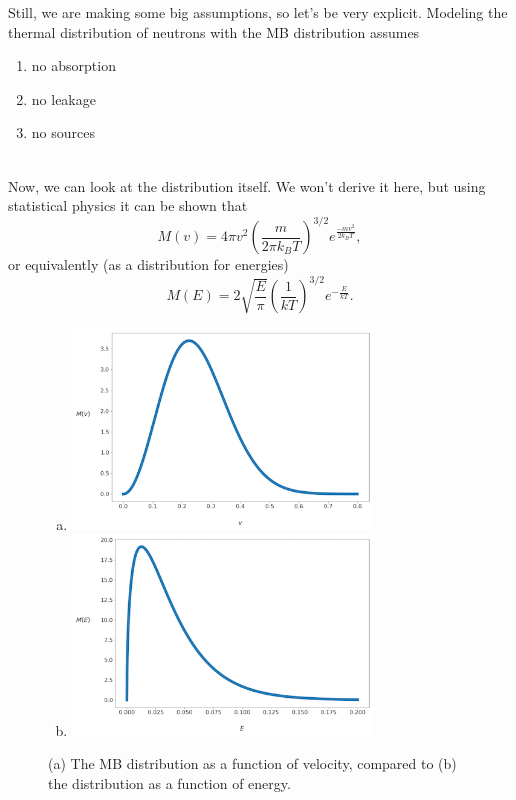 \documentclass{report}
\begin{document}
Still, we are making some big assumptions, so let's be very explicit. Modeling the thermal distribution of neutrons with the MB distribution assumes
\begin{enumerate}
\item no absorption
\item no leakage
\item no sources
\end{enumerate}
\-\\
Now, we can look at the distribution itself. We won't derive it here, but using statistical physics it can be shown that
$$ M(v) = 4 \pi v^2 \left(\frac{m}{2 \pi k_B T} \right)^{3/2} e^{\frac{-m v^2}{2 k_B T}} ,$$
or equivalently (as a distribution for energies)
$$ M(E) = 2\sqrt{\frac{E}{\pi}}\left(\frac{1}{kT}\right)^{3/2} e^{-\frac{E}{kT}} .$$
\begin{figure}[h]
\begin{multicols}{2}\begin{enumerate}[(a)]
\item \includegraphics[width=8cm]{mb-dist_v.png}
\item \includegraphics[width=8cm]{mb-dist_E.png}
\end{enumerate}\end{multicols}
\caption{(a) The MB distribution as a function of velocity, compared to (b) the distribution as a function of energy.}
\end{figure}
\end{document}

